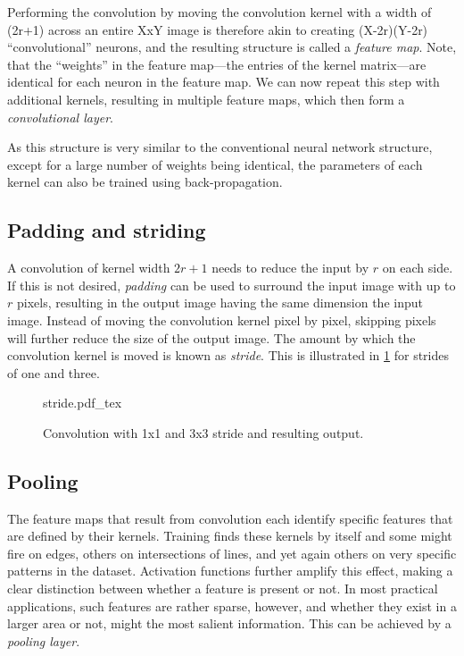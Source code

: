 Performing the convolution by moving the convolution kernel with a width of (2r+1) across an entire XxY image is therefore akin to creating (X-2r)(Y-2r) ``convolutional'' neurons, and the resulting structure is called a \textsl{feature map}. Note, that the ``weights'' in the feature map---the entries of the kernel matrix---are identical for each neuron in the feature map. We can now repeat this step with additional kernels, resulting in multiple feature maps, which then form a \textsl{convolutional layer}.

As this structure is very similar to the conventional neural network structure, except for a large number of weights being identical, the parameters of each kernel can also be trained using back-propagation. 

\subsection{Padding and striding}

A convolution of kernel width $2r+1$ needs to reduce the input by $r$ on each side. If this is not desired, \textsl{padding} can be used to surround the input image with up to $r$ pixels, resulting in the output image having the same dimension  the input image. Instead of moving the convolution kernel pixel by pixel, skipping pixels will further reduce the size of the output image. The amount by which the convolution kernel is moved is known as \textsl{stride}. This is illustrated in \cref{fig:stride} for strides of one and three.

\begin{figure}[htb]
    \centering
    \def\svgwidth{0.8\textwidth}
    {stride.pdf_tex}
    \caption{Convolution with 1x1 and 3x3 stride and resulting output.\label{fig:stride}}
\end{figure}

\subsection{Pooling}

The feature maps that result from convolution each identify specific features that are defined by their kernels. Training finds these kernels by itself and some might fire on edges, others on intersections of lines, and yet again others on very specific patterns in the dataset. Activation functions further amplify this effect, making a clear distinction between whether a feature is present or not. In most practical applications, such features are rather sparse, however, and whether they exist in a larger area or not, might the most salient information. This can be achieved by a \textsl{pooling layer}.

